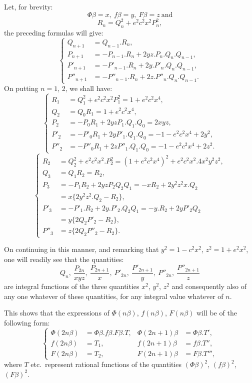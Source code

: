 \documentclass{article}
\begin{document}
Let, for brevity:
\[ \Phi\beta=x,\ f\beta=y,\ F\beta=z\ \text{and} \tag{40.} \]
\[ R_n=Q_n^{2}+e^{2}c^{2}x^{2}P_n^{2}, \tag{41.} \]
the preceding formulas will give:
\[ \left\{\begin{aligned} Q_{n+1}&=Q_{n-1}.R_n,\\ P_{n+1}&=-P_{n-1}.R_n+2yz.P_n.Q_n.Q_{n-1},\\ P'_{n+1}&=-P'_{n-1}.R_n+2y.P'_n.Q_n.Q_{n-1},\\ P''_{n+1}&=-P''_{n-1}.R_n+2z.P''_n.Q_n.Q_{n-1}. \end{aligned}\right. \tag{42.} \]
On putting $n=1$, 2, we shall have:
\[ \left\{\begin{aligned} R_1&=Q_1^{2}+e^{2}c^{2}x^{2}P_1^{2}=1+e^{2}c^{2}x^{4},\\ Q_2&=Q_0R_1=1+e^{2}c^{2}x^{4},\\ P_2&=-P_0R_1+2yzP_1.Q_1.Q_0=2xyz,\\ P'_2&=-P'_0R_1+2yP'_1.Q_1.Q_0=-1-e^{2}c^{2}x^{4}+2y^{2},\\ P''_2&=-P''_0R_1+2zP''_1.Q_1.Q_0=-1-e^{2}c^{2}x^{4}+2z^{2}. \end{aligned}\right. \tag{43.} \]
\[ \left\{\begin{aligned} R_2&=Q_2^{2}+e^{2}c^{2}x^{2}.P_2^{2}=(1+e^{2}c^{2}x^{4})^{2}+e^{2}c^{2}x^{2}.4x^{2}y^{2}z^{2},\\ Q_3&=Q_1R_2=R_2,\\ P_3&=-P_1R_2+2yzP_2Q_2Q_1=-xR_2+2y^{2}z^{2}x.Q_2\\ &=x\{2y^{2}z^{2}.Q_2-R_2\},\\ P'_3&=-P'_1.R_2+2y.P'_2.Q_2Q_1=-y.R_2+2yP'_2Q_2\\ &=y\{2Q_2P'_2-R_2\},\\ P''_3&=z\{2Q_2P''_2-R_2\}. \end{aligned}\right. \tag{44.} \]

On continuing in this manner, and remarking that $y^{2}=1-c^{2}x^{2}$, $z^{2}=1+e^{2}x^{2}$, one will readily see that the quantities:
\[ Q_n,\ \frac{P_{2n}}{xyz},\ \frac{P_{2n+1}}{x},\ P'_{2n},\ \frac{P'_{2n+1}}{y},\ P''_{2n},\ \frac{P''_{2n+1}}{z} \]
are integral functions of the three quantities $x^{2}$, $y^{2}$, $z^{2}$ and consequently also of any one whatever of these quantities, for any integral value whatever of $n$.

This shows that the expressions of $\Phi(n\beta)$, $f(n\beta)$, $F(n\beta)$ will be of the following form:
\[ \left\{\begin{aligned} \Phi(2n\beta)&=\Phi\beta.f\beta.F\beta.T, & \Phi(2n+1)\beta&=\Phi\beta.T',\\ f(2n\beta)&=T_1, & f(2n+1)\beta&=f\beta.T'',\\ F(2n\beta)&=T_2, & F(2n+1)\beta&=F\beta.T''', \end{aligned}\right. \tag{45.} \]
where $T$ etc.\ represent rational functions of the quantities $(\Phi\beta)^{2}$, $(f\beta)^{2}$, $(F\beta)^{2}$.
\end{document}
